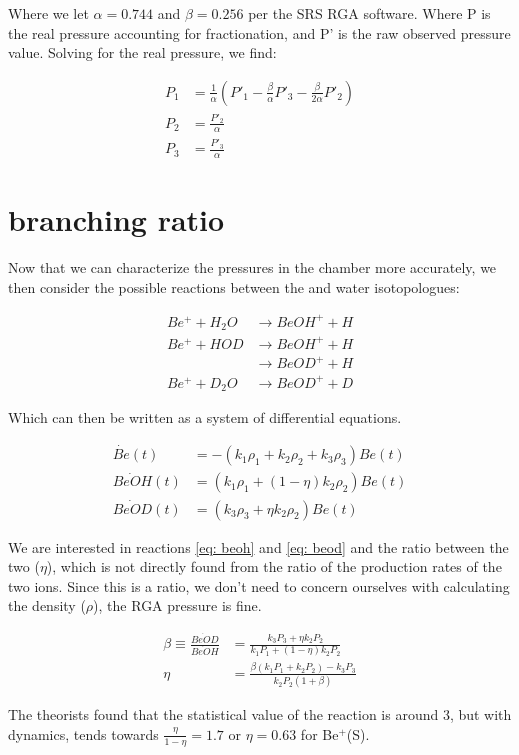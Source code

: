 Where we let $\alpha = 0.744$ and $\beta=0.256$ per the SRS RGA software. Where P is the real pressure accounting for fractionation, and P' is the raw observed pressure value. Solving for the real pressure, we find:

\begin{align}
	P_1 & = \frac{1}{\alpha}\left(P'_1 - \frac{\beta}{\alpha}P'_3 - \frac{\beta}{2\alpha} P'_2\right) \\
	P_2 & = \frac{P'_2}{\alpha} \\
	P_3 & = \frac{P'_3}{\alpha}
\end{align}

\section{ branching ratio}

Now that we can characterize the pressures in the chamber more accurately, we then consider the possible reactions between the  and water isotopologues:

\begin{align}
	Be^+ + H_2O & \rightarrow BeOH^+ + H \\
	Be^+ + HOD & \rightarrow BeOH^+ + H \label{eq: beoh} \\
	 & \rightarrow BeOD^+ + H \label{eq: beod} \\
	Be^+ + D_2O & \rightarrow BeOD^+ + D
\end{align}

Which can then be written as a system of differential equations.

\begin{align}
	\dot{Be}(t) & = -(k_1\rho_1+k_2\rho_2+k_3\rho_3)Be(t) \\
	\dot{BeOH}(t) & = (k_1\rho_1+(1-\eta)k_2\rho_2)Be(t) \\
	\dot{BeOD}(t) & = (k_3\rho_3+\eta k_2\rho_2)Be(t)
\end{align}

We are interested in reactions \ref{eq: beoh} and \ref{eq: beod} and the ratio between the two ($\eta$), which is not directly found from the ratio of the production rates of the two ions. Since this is a ratio, we don't need to concern ourselves with calculating the density ($\rho$), the RGA pressure is fine.

\begin{align}
	\beta \equiv \frac{\dot{BeOD}}{\dot{BeOH}} & = \frac{k_3P_3 + \eta k_2P_2}{k_1P_1 + (1-\eta)k_2P_2} \\
	\eta & = \frac{\beta(k_1P_1 + k_2P_2)-k_3P_3}{k_2P_2(1+\beta)}
\end{align}

The theorists found that the statistical value of the reaction is around 3, but with dynamics, tends towards $\frac{\eta}{1-\eta} = 1.7$ or $\eta=0.63$ for Be$^+$(S).
